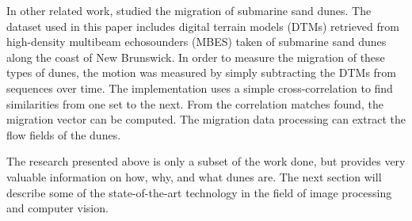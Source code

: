 In other related work, \cite{Application_spatial_cross_correlation_detection_submarine_dunes} studied the migration of submarine sand dunes. The dataset used in this paper includes digital terrain models (DTMs) retrieved from high-density multibeam echosounders (MBES) taken of submarine sand dunes along the coast of New Brunswick. In order to measure the migration of these types of dunes, the motion was measured by simply subtracting the DTMs from sequences over time. The implementation uses a simple cross-correlation to find similarities from one set to the next. From the correlation matches found, the migration vector can be computed. The migration data processing can extract the flow fields of the dunes.

The research presented above is only a subset of the work done, but provides very valuable information on how, why, and what dunes are. The next section will describe some of the state-of-the-art technology in the field of image processing and computer vision. 
 




